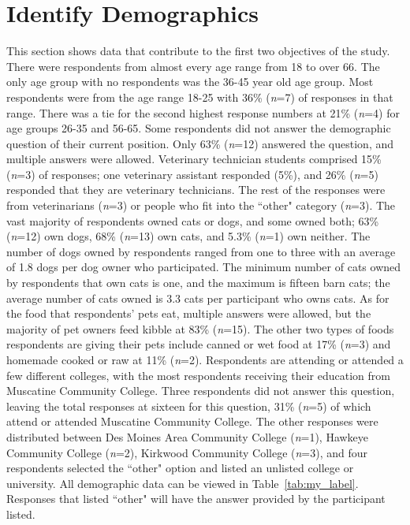 \section{Identify Demographics}
This section shows data that contribute to the first two objectives of the study. There were respondents from almost every age range from 18 to over 66. The only age group with no respondents was the 36-45 year old age group. Most respondents were from the age range 18-25 with 36\% (\textit{n}=7) of responses in that range. There was a tie for the second highest response numbers at 21\% (\textit{n}=4) for age groups 26-35 and 56-65. Some respondents did not answer the demographic question of their current position. Only 63\% (\textit{n}=12) answered the question, and multiple answers were allowed. Veterinary technician students comprised 15\% (\textit{n}=3) of responses; one veterinary assistant responded (5\%), and 26\% (\textit{n}=5) responded that they are veterinary technicians. The rest of the responses were from veterinarians (\textit{n}=3) or people who fit into the ``other" category (\textit{n}=3). The vast majority of respondents owned cats or dogs, and some owned both; 63\% (\textit{n}=12) own dogs, 68\% (\textit{n}=13) own cats, and 5.3\% (\textit{n}=1) own neither. The number of dogs owned by respondents ranged from one to three with an average of 1.8 dogs per dog owner who participated. The minimum number of cats owned by respondents that own cats is one, and the maximum is fifteen barn cats; the average number of cats owned is 3.3 cats per participant who owns cats. As for the food that respondents' pets eat, multiple answers were allowed, but the majority of pet owners feed kibble at 83\% (\textit{n}=15). The other two types of foods respondents are giving their pets include canned or wet food at 17\% (\textit{n}=3) and homemade cooked or raw at 11\% (\textit{n}=2). Respondents are attending or attended a few different colleges, with the most respondents receiving their education from Muscatine Community College. Three respondents did not answer this question, leaving the total responses at sixteen for this question, 31\% (\textit{n}=5) of which attend or attended Muscatine Community College. The other responses were distributed between Des Moines Area Community College (\textit{n}=1), Hawkeye Community College (\textit{n}=2), Kirkwood Community College (\textit{n}=3), and four respondents selected the ``other" option and listed an unlisted college or university. All demographic data can be viewed in Table~\ref{tab:my_label}. Responses that listed ``other" will have the answer provided by the participant listed.


